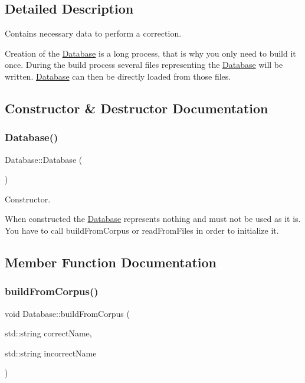 \subsection{Detailed Description}
Contains necessary data to perform a correction. 

Creation of the \hyperlink{classDatabase}{Database} is a long process, that is why you only need to build it once. During the build process several files representing the \hyperlink{classDatabase}{Database} will be written. \hyperlink{classDatabase}{Database} can then be directly loaded from those files. 

\subsection{Constructor \& Destructor Documentation}
\mbox{\label{classDatabase_a4703c80e6969d33565ea340f768fdadf}} 
\subsubsection{\texorpdfstring{Database()}{Database()}}
{\footnotesize\ttfamily Database\+::\+Database (\begin{DoxyParamCaption}{ }\end{DoxyParamCaption})}



Constructor. 

When constructed the \hyperlink{classDatabase}{Database} represents nothing and must not be used as it is. You have to call build\+From\+Corpus or read\+From\+Files in order to initialize it. 

\subsection{Member Function Documentation}
\mbox{\label{classDatabase_a98b7974dc1e1b76456fa35cc2665e6f9}} 
\subsubsection{\texorpdfstring{build\+From\+Corpus()}{buildFromCorpus()}}
{\footnotesize\ttfamily void Database\+::build\+From\+Corpus (\begin{DoxyParamCaption}\item[{std\+::string}]{correct\+Name,  }\item[{std\+::string}]{incorrect\+Name }\end{DoxyParamCaption})}



